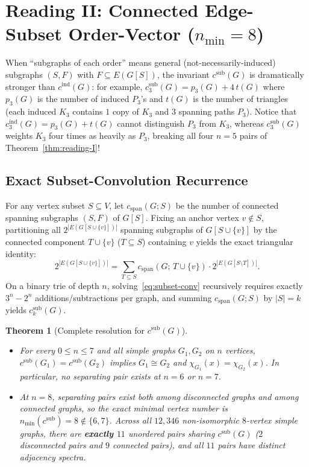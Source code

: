 \documentclass[11pt]{article}
\newtheorem{theorem}{Theorem}[section]
\theoremstyle{definition}
\newcommand{\cind}{c^{\mathrm{ind}}}
\newcommand{\csub}{c^{\mathrm{sub}}}
\begin{document}
\section{Reading II: Connected Edge-Subset Order-Vector (\texorpdfstring{$n_{\min} = 8$}{n\_min = 8})}

When ``subgraphs of each order'' means general (not-necessarily-induced) subgraphs $(S, F)$ with $F \subseteq E(G[S])$, the invariant $\csub(G)$ is dramatically stronger than $\cind(G)$: for example, $\csub_3(G) = p_3(G) + 4\,t(G)$ where $p_3(G)$ is the number of induced $P_3$'s and $t(G)$ is the number of triangles (each induced $K_3$ contains $1$ copy of $K_3$ and $3$ spanning paths $P_3$). Notice that $\cind_3(G) = p_3(G) + t(G)$ cannot distinguish $P_3$ from $K_3$, whereas $\csub_3(G)$ weights $K_3$ four times as heavily as $P_3$, breaking all four $n = 5$ pairs of Theorem~\ref{thm:reading-I}!

\subsection{Exact Subset-Convolution Recurrence}

For any vertex subset $S \subseteq V$, let $c_{\mathrm{span}}(G; S)$ be the number of connected spanning subgraphs $(S, F)$ of $G[S]$. Fixing an anchor vertex $v \notin S$, partitioning all $2^{|E(G[S \cup \{v\}])|}$ spanning subgraphs of $G[S \cup \{v\}]$ by the connected component $T \cup \{v\}$ ($T \subseteq S$) containing $v$ yields the exact triangular identity:
\begin{equation}
\label{eq:subset-conv}
  2^{|E(G[S \cup \{v\}])|} = \sum_{T \subseteq S} c_{\mathrm{span}}(G;\, T \cup \{v\}) \cdot 2^{|E(G[S \setminus T])|}.
\end{equation}
On a binary trie of depth $n$, solving~\eqref{eq:subset-conv} recursively requires exactly $3^n - 2^n$ additions/subtractions per graph, and summing $c_{\mathrm{span}}(G; S)$ by $|S| = k$ yields $\csub_k(G)$.

\begin{theorem}[Complete resolution for $\csub(G)$]
\label{thm:reading-II}
\leavevmode
\begin{itemize}
  \item[(a)] For every $0 \le n \le 7$ and all simple graphs $G_1, G_2$ on $n$ vertices, $\csub(G_1) = \csub(G_2)$ implies $G_1 \cong G_2$ and $\chi_{G_1}(x) = \chi_{G_2}(x)$. In particular, no separating pair exists at $n = 6$ or $n = 7$.
  \item[(b)] At $n = 8$, separating pairs exist both among disconnected graphs and among connected graphs, so the exact minimal vertex number is $n_{\min}(\csub) = 8 \notin \{6, 7\}$. Across all $12{,}346$ non-isomorphic $8$-vertex simple graphs, there are \textbf{exactly $11$} unordered pairs sharing $\csub(G)$ ($2$ disconnected pairs and $9$ connected pairs), and all $11$ pairs have distinct adjacency spectra.
\end{itemize}
\end{theorem}
\end{document}
